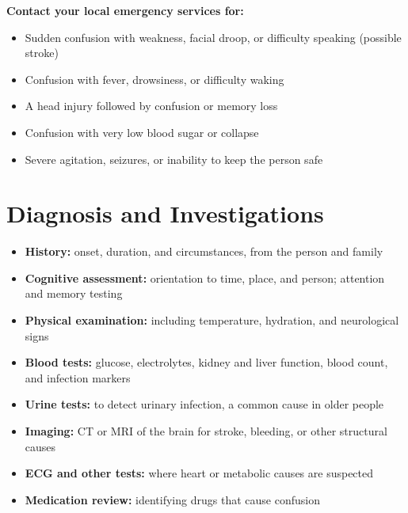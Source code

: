\textbf{Contact your local emergency services for:}
\begin{itemize}
    \item Sudden confusion with weakness, facial droop, or difficulty speaking (possible stroke)
    \item Confusion with fever, drowsiness, or difficulty waking
    \item A head injury followed by confusion or memory loss
    \item Confusion with very low blood sugar or collapse
    \item Severe agitation, seizures, or inability to keep the person safe
\end{itemize}

\section*{Diagnosis and Investigations}
\begin{itemize}
    \item \textbf{History:} onset, duration, and circumstances, from the person and family
    \item \textbf{Cognitive assessment:} orientation to time, place, and person; attention and memory testing
    \item \textbf{Physical examination:} including temperature, hydration, and neurological signs
    \item \textbf{Blood tests:} glucose, electrolytes, kidney and liver function, blood count, and infection markers
    \item \textbf{Urine tests:} to detect urinary infection, a common cause in older people
    \item \textbf{Imaging:} CT or MRI of the brain for stroke, bleeding, or other structural causes
    \item \textbf{ECG and other tests:} where heart or metabolic causes are suspected
    \item \textbf{Medication review:} identifying drugs that cause confusion
\end{itemize}

